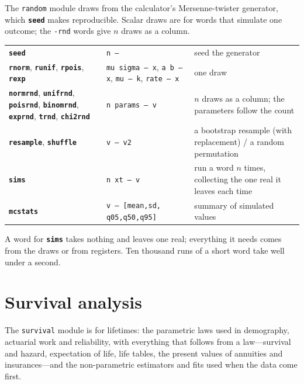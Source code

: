 \documentclass[11pt,letterpaper]{article}
\newcommand{\code}[1]{\texttt{#1}}
\newcommand{\cmd}[1]{\texttt{\textbf{#1}}}
\newcommand{\stk}[1]{\texttt{#1}}
\begin{document}
The \code{random} module draws from the calculator's Mersenne-twister generator, which \cmd{seed} makes reproducible. Scalar draws are for words that simulate one outcome; the \code{-rnd} words give $n$ draws as a column.
\begin{center}
\begin{tabular}{@{}>{\raggedright\arraybackslash}p{}>{\raggedright\arraybackslash}p{}>{\raggedright\arraybackslash}p{}@{}}
\toprule
\cmd{seed} & \stk{n --} & seed the generator \\
\cmd{rnorm}, \cmd{runif}, \cmd{rpois}, \cmd{rexp} & \stk{mu sigma -- x}, \stk{a b -- x}, \stk{mu -- k}, \stk{rate -- x} & one draw \\
\cmd{normrnd}, \cmd{unifrnd}, \cmd{poisrnd}, \cmd{binomrnd}, \cmd{exprnd}, \cmd{trnd}, \cmd{chi2rnd} & \stk{n params -- v} & $n$ draws as a column; the parameters follow the count \\
\cmd{resample}, \cmd{shuffle} & \stk{v -- v2} & a bootstrap resample (with replacement) / a random permutation \\
\cmd{sims} & \stk{n xt -- v} & run a word $n$ times, collecting the one real it leaves each time \\
\cmd{mcstats} & \stk{v -- [mean,sd,} \stk{q05,q50,q95]} & summary of simulated values \\
\bottomrule
\end{tabular}
\end{center}
A word for \cmd{sims} takes nothing and leaves one real; everything it needs comes from the draws or from registers. Ten thousand runs of a short word take well under a second.

\section{Survival analysis}
\label{sec:survival}

The \code{survival} module is for lifetimes: the parametric laws used in demography, actuarial work and reliability, with everything that follows from a law---survival and hazard, expectation of life, life tables, the present values of annuities and insurances---and the non-parametric estimators and fits used when the data come first.
\end{document}
